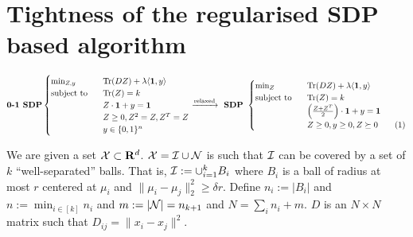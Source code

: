 \section{Tightness of the regularised SDP based algorithm}
\begin{equation*}
	\textbf{0-1 SDP} 
	\begin{cases}
		\min_{Z, y} \enspace &\tr(DZ) + \lambda \langle \mb 1, y\rangle\\
		\text{subject to } \enspace &\tr(Z) = k\\
		& Z\cdot \mb 1 + y = \mb 1\\	
		&Z\ge 0, Z^2 = Z, Z^T = Z \\
		& y \in \{0, 1\}^n
	\end{cases}
	\xrightarrow{\text{relaxed}} \textbf{ SDP } 
	\begin{cases}
		\min_{Z} \enspace &\tr(DZ) + \lambda \langle \mb 1, y\rangle\\
        \text{subject to } \enspace &\tr(Z) = k\\
		& \Big(\frac{Z+Z^T}{2}\Big)\cdot \mb 1 + y = \mb 1\\		
		&Z \ge 0, y \ge 0, Z \succeq 0 \numberthis\label{a-eqn:regularisedSDP}
	\end{cases}
\end{equation*}

We are given a set $\mathcal X \subset \mathbf R^d$. $\mathcal X = \mathcal I \cup \mathcal N$ is such that $\mathcal I$ can be covered by a set of $k$ ``well-separated'' balls. That is, $\mathcal I := \cup_{i=1}^k B_i$ where $B_i$ is a ball of radius at most $r$ centered at $\mu_i$ and $\|\mu_i - \mu_j\|_{2}^{2} \ge \delta r$. %
Define $n_i := |B_i|$ and $n := \min_{i\in[k]} n_i$ and $m := |\mathcal N| = n_{k+1}$ and $N = \sum_i n_i + m$. $D$ is an $N\times N$ matrix such that $D_{ij} = \|x_i -x_j\|^2$.  

